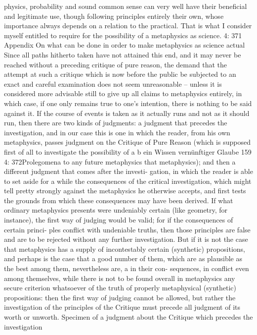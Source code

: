 physics, probability and sound common sense can very well have their
beneﬁcial and legitimate use, though following principles entirely their
own, whose importance always depends on a relation to the practical.
That is what I consider myself entitled to require for the possibility
of a metaphysics as science.
4: 371
Appendix
On what can be done in order to make
metaphysics as science actual
Since all paths hitherto taken have not attained this end, and it may never
be reached without a preceding critique of pure reason, the demand that
the attempt at such a critique which is now before the public be subjected
to an exact and careful examination does not seem unreasonable – unless
it is considered more advisable still to give up all claims to metaphysics
entirely, in which case, if one only remains true to one’s intention, there
is nothing to be said against it. If the course of events is taken as it actually
runs and not as it should run, then there are two kinds of judgments: a
judgment that precedes the investigation, and in our case this is one in which
the reader, from his own metaphysics, passes judgment on the Critique of
Pure Reason (which is supposed ﬁrst of all to investigate the possibility of
a
b
ein Wissen
vernünftiger Glaube
159
4: 372Prolegomena to any future metaphysics
that metaphysics); and then a different judgment that comes after the investi-
gation, in which the reader is able to set aside for a while the consequences
of the critical investigation, which might tell pretty strongly against the
metaphysics he otherwise accepts, and ﬁrst tests the grounds from which
these consequences may have been derived. If what ordinary metaphysics
presents were undeniably certain (like geometry, for instance), the ﬁrst
way of judging would be valid; for if the consequences of certain princi-
ples conﬂict with undeniable truths, then those principles are false and
are to be rejected without any further investigation. But if it is not the
case that metaphysics has a supply of incontestably certain (synthetic)
propositions, and perhaps is the case that a good number of them, which
are as plausible as the best among them, nevertheless are, a in their con-
sequences, in conﬂict even among themselves, while there is not to be
found overall in metaphysics any secure criterion whatsoever of the truth
of properly metaphysical (synthetic) propositions: then the ﬁrst way of
judging cannot be allowed, but rather the investigation of the principles
of the Critique must precede all judgment of its worth or unworth.
Specimen of a judgment about the Critique
which precedes the investigation
